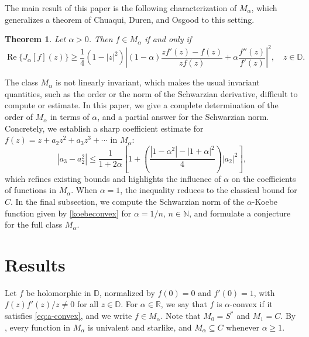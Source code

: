 \documentclass[reqno]{amsart}
\theoremstyle{plain}
\newtheorem{theo}{Theorem}[section]
\theoremstyle{definition}
\begin{document}
The main result of this paper is the following characterization of $M_\alpha$, which
generalizes a theorem of Chuaqui, Duren, and Osgood \cite{CDO2011} to this setting.

\begin{theo}\label{thm:main}
Let $\alpha > 0$. Then $f \in M_\alpha$ if and only if
\begin{equation}\label{main}
\operatorname{Re}\{J_\alpha[f](z)\} \geq \frac{1}{4}(1 - |z|^2) \left|
(1-\alpha)\frac{zf'(z) - f(z)}{zf(z)} + \alpha\frac{f''(z)}{f'(z)}
\right|^2, \quad z \in \mathbb{D}.
\end{equation}
\end{theo}

The class $M_\alpha$ is not linearly invariant, which makes the usual invariant quantities, such as the order or the norm of the Schwarzian derivative, difficult to compute or estimate. In this paper, we give a complete determination of the order of $M_\alpha$ in terms of $\alpha$, and a partial answer for the Schwarzian norm. Concretely, we establish a sharp coefficient estimate for $f(z) = z + a_2 z^2 +
a_3 z^3 + \cdots$ in $M_\alpha$:
\[|a_3 - a_2^2| \leq \frac{1}{1 + 2\alpha}\left[1 + \left(\frac{|1-\alpha^2| - |1+\alpha|^2}{4}\right)|a_2|^2\right],\]
which refines existing bounds and highlights the influence of $\alpha$ on the coefficients of functions in $M_\alpha$. When $\alpha = 1$, the inequality reduces to the classical bound for $C$. In the final subsection, we compute the Schwarzian norm of the $\alpha$-Koebe function given by \eqref{koebeconvex} for $\alpha = 1/n$, $n \in \mathbb{N}$, and formulate a conjecture for the full class $M_\alpha$.

\section{Results}\label{sec2}

Let $f$ be holomorphic in $\mathbb{D}$, normalized by $f(0) = 0$ and $f'(0) = 1$, with $f(z)f'(z)/z \neq 0$ for all $z \in \mathbb{D}$. For $\alpha \in \mathbb{R}$, we say that $f$ is $\alpha$-convex if it satisfies \eqref{eq:a-convex}, and we write $f \in M_\alpha$. Note that $M_0 = S^*$ and $M_1 = C$. By \cite{MMR1973}, every
function in $M_\alpha$ is univalent and starlike, and $M_\alpha \subseteq C$ whenever $\alpha \geq 1$.
\end{document}
